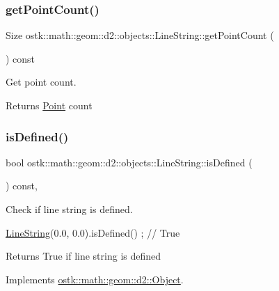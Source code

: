 \subsubsection{\texorpdfstring{get\+Point\+Count()}{getPointCount()}}
{\footnotesize\ttfamily Size ostk\+::math\+::geom\+::d2\+::objects\+::\+Line\+String\+::get\+Point\+Count (\begin{DoxyParamCaption}{ }\end{DoxyParamCaption}) const}



Get point count. 

\begin{DoxyReturn}{Returns}
\hyperlink{classostk_1_1math_1_1geom_1_1d2_1_1objects_1_1_point}{Point} count 
\end{DoxyReturn}
\mbox{\label{classostk_1_1math_1_1geom_1_1d2_1_1objects_1_1_line_string_a0fd7edff5727e1373dbea759313313cc}} 
\subsubsection{\texorpdfstring{is\+Defined()}{isDefined()}}
{\footnotesize\ttfamily bool ostk\+::math\+::geom\+::d2\+::objects\+::\+Line\+String\+::is\+Defined (\begin{DoxyParamCaption}{ }\end{DoxyParamCaption}) const\hspace{0.3cm}{\ttfamily [override]}, {\ttfamily [virtual]}}



Check if line string is defined. 


\begin{DoxyCode}
\hyperlink{classostk_1_1math_1_1geom_1_1d2_1_1objects_1_1_line_string_ae99b409ec3eddf804a7c83f2452b1249}{LineString}(0.0, 0.0).isDefined() ; \textcolor{comment}{// True}
\end{DoxyCode}


\begin{DoxyReturn}{Returns}
True if line string is defined 
\end{DoxyReturn}


Implements \hyperlink{classostk_1_1math_1_1geom_1_1d2_1_1_object_a456cc7121218d24c1322d0fe54230cc4}{ostk\+::math\+::geom\+::d2\+::\+Object}.


